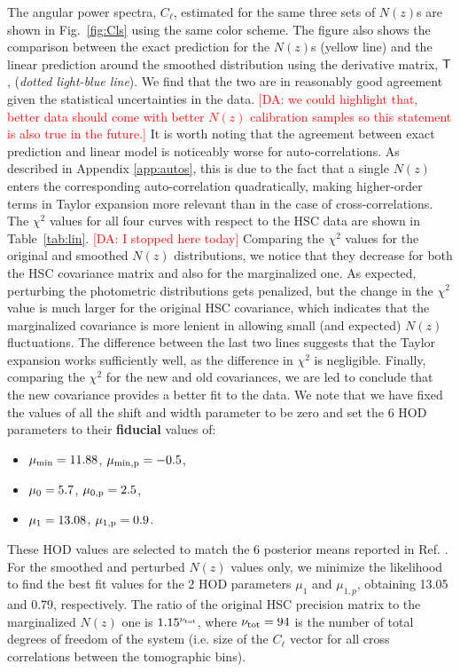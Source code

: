 \documentclass[a4paper,11pt]{article}
\newcommand{\da}[1]{{\textcolor{red}{[DA: #1]}}}
\begin{document}
      The angular power spectra, $C_\ell$, estimated for the same three sets of $N(z)$s are shown in Fig.~\ref{fig:Cls} using the same color scheme. The figure also shows the comparison between the exact prediction for the $N(z)$s (yellow line) and the linear prediction around the smoothed distribution using the derivative matrix, ${\sf T}$, (\textit{dotted light-blue line}). We find that the two are in reasonably good agreement given the statistical uncertainties in the data. \da{we could highlight that, better data should come with better $N(z)$ calibration samples so this statement is also true in the future.} It is worth noting that the agreement between exact prediction and linear model is noticeably worse for auto-correlations. As described in Appendix \ref{app:autos}, this is due to the fact that a single $N(z)$ enters the corresponding auto-correlation quadratically, making higher-order terms in Taylor expansion more relevant than in the case of cross-correlations. The $\chi^2$ values for all four curves with respect to the HSC data are shown in Table~\ref{tab:lin}. \da{I stopped here today} Comparing the $\chi^2$ values for the original and smoothed $N(z)$ distributions, we notice that they decrease for both the HSC covariance matrix and also for the marginalized one. As expected, perturbing the photometric distributions gets penalized, but the change in the $\chi^2$ value is much larger for the original HSC covariance, which indicates that the marginalized covariance is more lenient in allowing small (and expected) $N(z)$ fluctuations. The difference between the last two lines suggests that the Taylor expansion works sufficiently well, as the difference in $\chi^2$ is negligible. Finally, comparing the $\chi^2$ for the new and old covariances, we are led to conclude that the new covariance provides a better fit to the data. We note that we have fixed the values of all the shift and width parameter to be zero and set the 6 HOD parameters to their \textbf{fiducial} values of:
      \begin{itemize}
        \item $\mu_{\rm min} = 11.88$, $\mu_{\rm min,p} = -0.5$,
        \item $\mu_{\rm 0} = 5.7$, $\mu_{\rm 0,p} = 2.5$,
        \item $\mu_{\rm 1} = 13.08$, $\mu_{\rm 1,p} = 0.9$.
      \end{itemize}
      These HOD values are selected to match the 6 posterior means reported in Ref. \cite{1912.08209}. For the smoothed and perturbed $N(z)$ values only, we minimize the likelihood to find the best fit values for the 2 HOD parameters $\mu_1$ and $\mu_{1,p}$, obtaining 13.05 and 0.79, respectively. The ratio of  the original HSC precision matrix to the marginalized $N(z)$ one is  $1.15^{\nu_{\rm tot}}$, where $\nu_{\rm tot} = 94$ is the number of total degrees of freedom of the system (i.e. size of the $C_\ell$ vector for all cross correlations between the tomographic bins).
\end{document}
